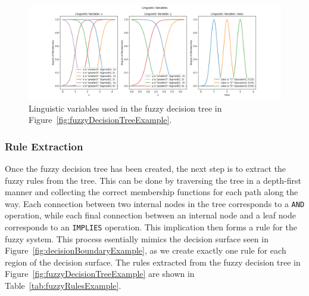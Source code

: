 \begin{figure}[H]
    \centering

    \includegraphics[width=\linewidth,trim={3.5cm 0 3.5cm 1cm},clip]{figures/ProofOfConcepts/fuzzy_sets.png}

    \caption[Linguistic variables for the converted fuzzy decision tree]{Linguistic variables used in the fuzzy decision tree in Figure~\ref{fig:fuzzyDecisionTreeExample}.}
    \label{fig:fuzzyDecisionTreeLinguisticVariables}
\end{figure}

\subsubsection{Rule Extraction}

Once the fuzzy decision tree has been created, the next step is to extract the fuzzy rules from the tree. This can be done by traversing the tree in a depth-first manner and collecting the correct membership functions for each path along the way. Each connection between two internal nodes in the tree corresponds to a \texttt{AND} operation, while each final connection between an internal node and a leaf node corresponds to an \texttt{IMPLIES} operation. This implication then forms a rule for the fuzzy system.
This process esentially mimics the decision surface seen in Figure~\ref{fig:decisionBoundaryExample}, as we create exactly one rule for each region of the decision surface. The rules extracted from the fuzzy decision tree in Figure~\ref{fig:fuzzyDecisionTreeExample} are shown in Table~\ref{tab:fuzzyRulesExample}.

\newcommand{\is}{\textit{ is }}


